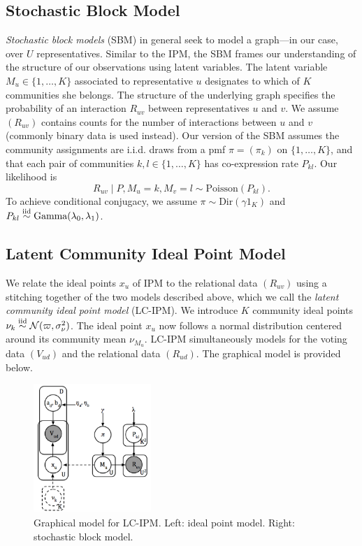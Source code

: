 \documentclass{article}
\begin{document}
\subsection{Stochastic Block Model}

{\sl Stochastic block models} (SBM) \cite{Snijders1997} in general seek to model a graph---in our case, over $U$ representatives. Similar to the IPM, the SBM frames our understanding of the structure of our observations using latent variables. The latent variable $M_u\in\{1,\dots,K\}$ associated to representative $u$ designates to which of $K$ communities she belongs. The structure of the underlying graph specifies the probability of an interaction $R_{uv}$ between representatives $u$ and $v$. We assume $(R_{uv})$ contains counts for the number of interactions between $u$ and $v$ (commonly binary data is used instead). Our version of the SBM assumes the community assignments are i.i.d. draws from a pmf $\pi = (\pi_k)$ on $\{1,\dots,K\}$, and that each pair of communities $k,l\in\{1,\dots, K\}$ has co-expression rate $P_{kl}$. Our likelihood is
\begin{equation}
R_{uv} \mid P, M_u=k, M_v=l\sim \text{Poisson}(P_{kl}).
\end{equation}
To achieve conditional conjugacy, we assume $\pi \sim \text{Dir}(\gamma1_K)$ and $P_{kl} \simiid \text{Gamma}(\lambda_0,\lambda_1)$.


\subsection{Latent Community Ideal Point Model}

We relate the ideal points $x_u$ of IPM to the relational data $(R_{uv})$ using a stitching together of the two models described above, which we call the {\sl latent community ideal point model} (LC-IPM). We introduce $K$ community ideal points $\nu_k\simiid\cn(\varpi,\sigma^2_\nu)$. The ideal point $x_u$ now follows a normal distribution centered around its community mean $\nu_{M_u}$. LC-IPM simultaneously models for the voting data $(V_{ud})$ and the relational data $(R_{ud})$. The graphical model is provided below.


\begin{figure}[h]
  \centering
        \includegraphics[width=12em]{lcipm2.png}
  \caption{Graphical model for LC-IPM. Left: ideal point model. Right: stochastic block model.}
      \label{fig:pgm}
\end{figure}
\end{document}
